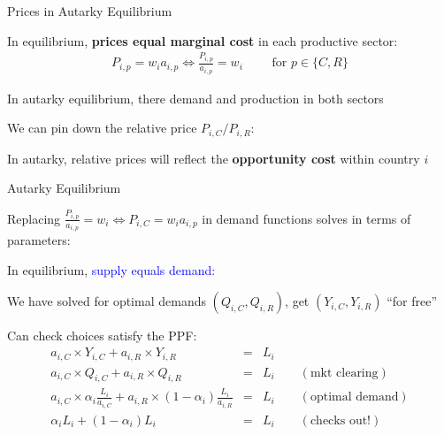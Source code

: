 \documentclass[notes,11pt, aspectratio=169, xcolor=table]{beamer}
\newcommand{\blue}[1]{\textcolor{blue}{#1}}
\newenvironment{wideitemize}{\itemize\addtolength{\itemsep}{10pt}}{\enditemize}
\begin{document}
\begin{frame}{Prices in Autarky Equilibrium}
\begin{wideitemize}
        \item In equilibrium, \textbf{prices equal marginal cost} in each productive sector:
        \begin{eqnarray*}
            P_{i,p} = w_i a_{i,p} \iff \frac{P_{i,p}}{a_{i,p}} = w_i  \qquad \text{ for } p \in\{C,R\}
        \end{eqnarray*}
        \item<2-> In autarky equilibrium, there demand and production in both sectors
        \item We can pin down the relative price $P_{i,C} / P_{i,R}$:
        \begin{center}
        \end{center}
    \item<3-> In autarky, relative prices will reflect the \textbf{opportunity cost} within country $i$

\end{wideitemize}
\end{frame}

\begin{frame}{Autarky Equilibrium}
\begin{wideitemize}
    \item Replacing $\frac{P_{i,p}}{a_{i,p}} = w_i \iff P_{i,C} = w_i a_{i,p}$ in demand functions solves in terms of parameters:
\begin{center}
\end{center}
    \item<2-> In equilibrium, \blue{supply equals demand}:

    \begin{center}
\end{center}

    \item<4-> We have solved for optimal demands $( Q_{i,C}, Q_{i,R})$, get $(Y_{i,C}, Y_{i,R})$   ``for free''
    \item<5->  Can check choices satisfy the PPF:
    {\scriptsize
        \begin{eqnarray*}
            a_{i,C} \times Y_{i,C} + a_{i,R} \times Y_{i,R} &=& L_i \\
            a_{i,C} \times Q_{i,C} + a_{i,R} \times Q_{i,R} &=& L_i \qquad (\text{mkt clearing}) \\
            a_{i,C} \times \alpha_i  \frac{L_i}{a_{i,C}} + a_{i,R} \times (1-\alpha_i) \frac{L_i}{a_{i,R}}  &=& L_i \qquad (\text{optimal demand}) \\
            \alpha_i  L_i + (1-\alpha_i) L_i  &=& L_i \qquad (\text{checks out!})
        \end{eqnarray*}
        }
\end{wideitemize}
\end{frame}
\end{document}
